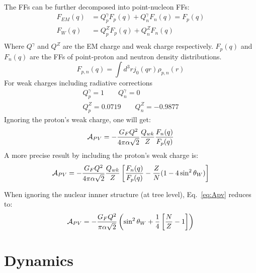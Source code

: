 The FFs can be further decomposed into point-nucleon FFs:
\begin{equation}
    \begin{aligned}
	F_{EM}(q) &= Q^\gamma_p F_p(q) + Q^\gamma_n F_n(q)  = F_p(q)	\\
	F_{W}(q)  &= Q^Z_p F_p(q) + Q^Z_n F_n(q)  \\
    \end{aligned}
\end{equation}
Where $Q^\gamma$ and $Q^Z$ are the EM charge and weak charge respectively.
$F_p(q)$ and $F_n(q)$ are the FFs of point-proton and neutron density distributions. 
\begin{equation}
    F_{p,n}(q) = \int d^3r j_0(qr) \rho_{p,n}(r)
\end{equation}
For weak charges including radiative corrections
\begin{equation}
    \begin{gathered}
	Q^\gamma_p = 1  \qquad Q^\gamma_n = 0   \\
	Q^Z_p = 0.0719    \qquad Q^Z_n = -0.9877
    \end{gathered}
\end{equation}
Ignoring the proton's weak charge, one will get:
\begin{equation}
    \mathcal{A}_{PV} = -\frac{G_FQ^2}{4\pi\alpha\sqrt{2}}\frac{Q_{wk}}{Z} \frac{F_n(q)}{F_p(q)} 
\end{equation}
A more precise result by including the proton's weak charge is:
\begin{equation}
    \mathcal{A}_{PV} = -\frac{G_FQ^2}{4\pi\alpha\sqrt{2}}\frac{Q_{wk}}{Z}\left[ \frac{F_n(q)}{F_p(q)} - \frac{Z}{N}(1-4\sin^2\theta_W) \right]
    \label{eq:Apv}
\end{equation}

When ignoring the nuclear innner structure (at tree level), Eq.~\ref{eq:Apv} reduces to:
\begin{equation}
    \mathcal{A}_{PV} = -\frac{G_F Q^2}{\pi\alpha\sqrt{2}} \left(\sin^2\theta_W + \frac{1}{4}\left[ \frac{N}{Z} - 1 \right] \right)
\end{equation}

\section{Dynamics}
\begin{center}
\end{center}

